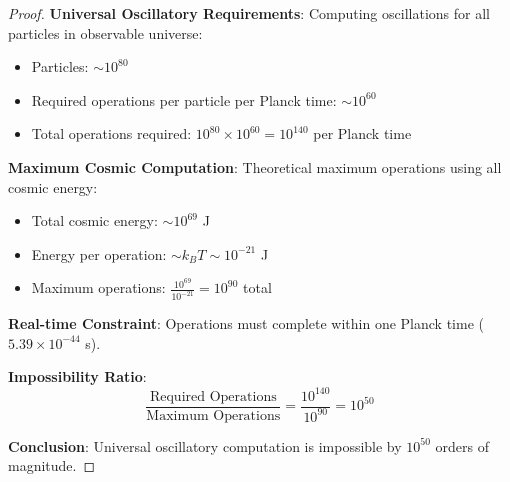 \documentclass[12pt,a4paper]{article}
\begin{document}
\begin{proof}
\textbf{Universal Oscillatory Requirements}: Computing oscillations for all particles in observable universe:
\begin{itemize}
\item Particles: $\sim 10^{80}$
\item Required operations per particle per Planck time: $\sim 10^{60}$
\item Total operations required: $10^{80} \times 10^{60} = 10^{140}$ per Planck time
\end{itemize}

\textbf{Maximum Cosmic Computation}: Theoretical maximum operations using all cosmic energy:
\begin{itemize}
\item Total cosmic energy: $\sim 10^{69}$ J
\item Energy per operation: $\sim k_B T \sim 10^{-21}$ J
\item Maximum operations: $\frac{10^{69}}{10^{-21}} = 10^{90}$ total
\end{itemize}

\textbf{Real-time Constraint}: Operations must complete within one Planck time ($5.39 \times 10^{-44}$ s).

\textbf{Impossibility Ratio}:
$$\frac{\text{Required Operations}}{\text{Maximum Operations}} = \frac{10^{140}}{10^{90}} = 10^{50}$$

\textbf{Conclusion}: Universal oscillatory computation is impossible by $10^{50}$ orders of magnitude.
\end{proof}
\end{document}
